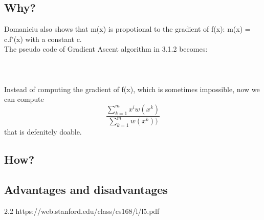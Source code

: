 \subsection{Why?}
Domaniciu also shows that m(x) is propotional to the gradient of f(x): m(x) = c.f'(x) with a constant c.\\ The pseudo code of Gradient Ascent algorithm in 3.1.2 becomes:\\\\
\\\\Instead of computing the gradient of f(x), which is sometimes impossible, now we can compute \[ \frac{\sum_{k=1}^{m}x^i{w(x^k) }}{\sum_{k=1}^{m}{w(x^k) }) }\] that is defenitely doable. 
\subsection{How?}

\subsection{Advantages and disadvantages}

2.2 https://web.stanford.edu/class/cs168/l/l5.pdf